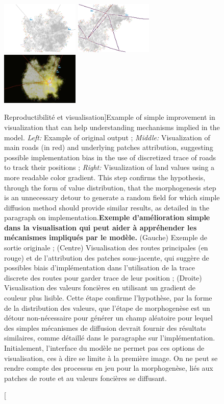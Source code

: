 \begin{figure}
\centering
\hspace{-2cm}
\includegraphics[width=0.33\textwidth]{Figures/Reproducibility/stdView}
\hfill
\includegraphics[width=0.33\textwidth]{Figures/Reproducibility/ViewRoads}
\hfill
\includegraphics[width=0.33\textwidth]{Figures/Reproducibility/landValues_cityFinished}
\caption[Reproducibility and visualization][Reproductibilité et visualisation]{Example of simple improvement in visualization that can help understanding mechanisms implied in the model. \textit{Left: } Example of original output ; \textit{Middle: } Visualization of main roads (in red) and underlying patches attribution, suggesting possible implementation bias in the use of discretized trace of roads to track their positions ; \textit{Right: }Visualization of land values using a more readable color gradient. This step confirms the hypothesis, through the form of value distribution, that the morphogenesis step is an unnecessary detour to generate a random field for which simple diffusion method should provide similar results, as detailed in the paragraph on implementation.}{\textbf{Exemple d'amélioration simple dans la visualisation qui peut aider à appréhender les mécanismes impliqués par le modèle.} (Gauche) Exemple de sortie originale ; (Centre) Visualisation des routes principales (en rouge) et de l'attribution des patches sous-jacente, qui suggère de possibles biais d'implémentation dans l'utilisation de la trace discrete des routes pour garder trace de leur position ; (Droite) Visualisation des valeurs foncières en utilisant un gradient de couleur plus lisible. Cette étape confirme l'hypothèse, par la forme de la distribution des valeurs, que l'étape de morphogenèse est un détour non-nécessaire pour générer un champ aléatoire pour lequel des simples mécanismes de diffusion devrait fournir des résultats similaires, comme détaillé dans le paragraphe sur l'implémentation. Initialement, l'interface du modèle ne permet pas ces options de visualisation, ces à dire se limite à la première image. On ne peut se rendre compte des processus en jeu pour la morphogenèse, liés aux patches de route et au valeurs foncières se diffusant.}
\label{fig:example_tij_viz}
\end{figure}

